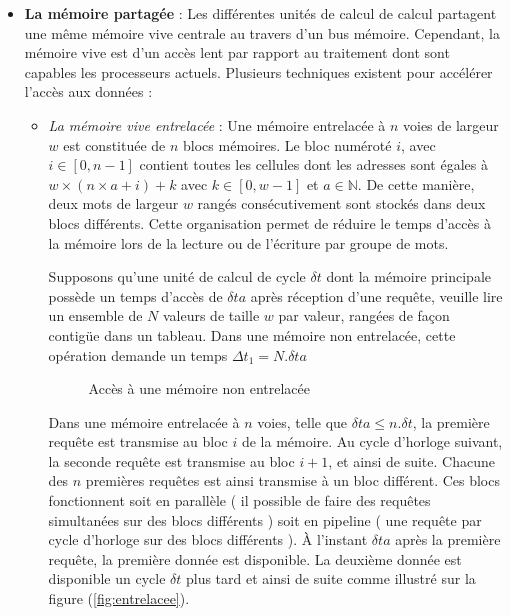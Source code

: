 \documentclass[fleqn,11pt]{article}
\begin{document}
\begin{itemize}
\item \textbf{La mémoire partagée} : Les différentes unités de calcul de calcul partagent une même mémoire vive centrale au travers d'un bus mémoire. Cependant, la mémoire vive est d'un accès lent par rapport au traitement dont sont capables les processeurs actuels. Plusieurs techniques existent pour accélérer l'accès aux données :
  \begin{itemize}
  \item \textsl{La mémoire vive entrelacée} : Une mémoire entrelacée à $n$ voies de largeur $w$ est constituée de $n$ blocs mémoires. 
  Le bloc numéroté $i$, avec $i\in \left[0, n-1\right]$ contient toutes les cellules dont les adresses sont égales à 
  $w\times ( n \times a + i ) +  k $ avec $k\in \left[0,w-1\right]$ et $a\in \mathds{N}$. 
  De cette manière, deux mots de largeur $w$ rangés consécutivement sont stockés dans deux blocs différents. 
  Cette organisation permet de réduire  le temps d'accès à la mémoire lors de la lecture ou de l'écriture par groupe de mots.

Supposons qu'une unité de calcul de cycle $\delta t$ dont la mémoire principale possède un temps d'accès de $\delta ta$  après réception d'une requête, veuille lire un ensemble de $N$ valeurs de taille $w$ par valeur, rangées de façon contigüe dans un tableau. Dans une mémoire non entrelacée, cette opération demande un temps $\Delta t_{1} = N.\delta ta$

\begin{figure}[h]
\begin{center}
\end{center}
\caption{Accès à une mémoire non entrelacée}
\end{figure}

Dans une mémoire entrelacée à $n$ voies, telle que $\delta ta \leq n.\delta t$, la première requête est transmise au bloc $i$ de la mémoire. Au cycle d'horloge suivant, la seconde requête est transmise au bloc $i+1$, et ainsi de suite. Chacune des $n$ premières requêtes est ainsi transmise à un bloc différent. Ces blocs fonctionnent soit en parallèle  ( il possible de faire des requêtes simultanées sur des blocs différents )  soit en pipeline ( une requête par cycle d'horloge sur des blocs différents ). À l'instant $\delta ta$ après la première requête, la première donnée est disponible. La deuxième donnée est disponible un cycle $\delta t$ plus tard et ainsi de suite comme illustré sur la figure (\ref{fig:entrelacee}).


\end{itemize}
\end{itemize}
\end{document}
